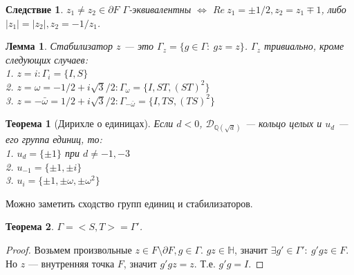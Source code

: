 \documentclass[11pt]{article}
\newtheorem{theorem}{Теорема}
\newtheorem{lemma}{Лемма}
\newtheorem{corollary}{Следствие}
\newcommand{\Q}{\mathbb{Q}}
\begin{document}
\begin{corollary}
    $z_1 \neq z_2 \in \partial F$ $\Gamma$-эквивалентны $\iff$ $Re\ z_1 = \pm 1/2, z_2 = z_1 \mp 1$, либо $|z_1| = |z_2|, z_2 = -1/z_1$.
\end{corollary}

\begin{lemma}
    Стабилизатор $z$ --- это $\Gamma_z = \{g \in \Gamma:\ gz = z\}$.
    $\Gamma_z$ тривиально, кроме следующих случаев: \\
    1. $z = i: \Gamma_i = \{I, S\}$ \\
    2. $z = \omega = -1/2+i\sqrt{3}/2: \Gamma_{\omega} = \{I, ST, (ST)^2\}$ \\
    3. $z = -\bar{\omega} = 1/2+i\sqrt{3}/2: \Gamma_{-\bar{\omega}} = \{I, TS, (TS)^2\}$
\end{lemma}

\begin{theorem}[Дирихле о единицах]
    Если $d < 0$, $\mathcal{D}_{\Q(\sqrt{d})}$ --- кольцо целых и $u_d$ --- его группа единиц, то: \\
    1. $u_d = \{\pm 1\}$ при $d \neq -1, -3$ \\
    2. $u_{-1} = \{\pm 1, \pm i\}$ \\
    3. $u_i = \{\pm 1, \pm \omega, \pm \omega^2\}$
\end{theorem}

Можно заметить сходство групп единиц и стабилизаторов.

\begin{theorem}
    $\Gamma = <S, T> = \Gamma'$.
\end{theorem}
\begin{proof}
    Возьмем произвольные $z \in F \setminus \partial F, g \in \Gamma$.
    $gz \in \mathbb{H}$, значит $\exists g' \in \Gamma':\ g'gz \in F$.
    Но $z$ --- внутренняя точка $F$, значит $g'gz = z$.
    Т.е. $g'g = I$.
\end{proof}
\end{document}
